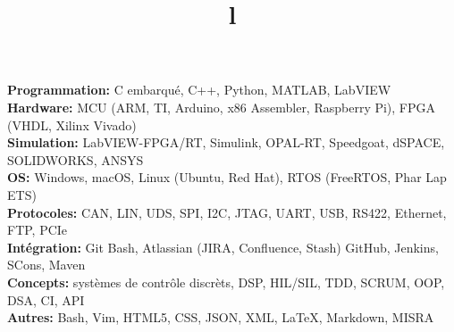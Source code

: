 \documentclass[mm]{res}
\begin{document}



\begin{resume}

\npspctoprule
\section{\headingskills}
\tb \textbf{Programmation:} C embarqu\'e, C++, Python, MATLAB, LabVIEW\\
\tb \textbf{Hardware:} MCU (ARM, TI, Arduino, x86 Assembler, Raspberry Pi), FPGA (VHDL, Xilinx Vivado)\\
\tb \textbf{Simulation:} LabVIEW-FPGA/RT, Simulink, OPAL-RT, Speedgoat, dSPACE, SOLIDWORKS, ANSYS\\
\tb \textbf{OS:} Windows, macOS, Linux (Ubuntu, Red Hat), RTOS (FreeRTOS, Phar Lap ETS)\\
\tb \textbf{Protocoles:} CAN, LIN, UDS, SPI, I2C, JTAG, UART, USB, RS422, Ethernet, FTP, PCIe\\
\tb \textbf{Int\'egration:} Git Bash, Atlassian (JIRA, Confluence, Stash) GitHub, Jenkins, SCons, Maven\\
\tb \textbf{Concepts:} syst\`emes de contr\^ole discr\`ets, DSP, HIL/SIL, TDD, SCRUM, OOP, DSA, CI, API\\
\tb \textbf{Autres:} Bash, Vim, HTML5, CSS, JSON, XML, \LaTeX, Markdown, MISRA\xspace


\toprule

\section{\headingeducation}
\begin{format}
\\
\title{l}\\
\end{format}  


\end{resume}
\end{document}
